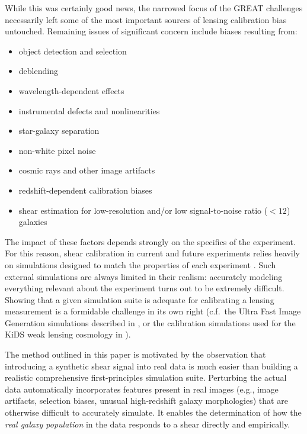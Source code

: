 \documentclass[iop]{emulateapj}
\newcommand\rmcomment[1]{\textcolor{red}{(RM: #1)}}
\begin{document}
While this was certainly good news, the narrowed focus of the GREAT
challenges necessarily left some of the most important sources of
lensing calibration bias untouched. Remaining issues of significant
concern include biases resulting from:
\begin{itemize}
\item object detection and selection
\item deblending
\item wavelength-dependent effects
\item instrumental defects and nonlinearities
\item star-galaxy separation
\item non-white pixel noise
\item cosmic rays and other image artifacts
\item redshift-dependent calibration biases
\item shear estimation for low-resolution and/or low signal-to-noise ratio ($<12$) galaxies
\end{itemize}
The impact of these factors depends strongly on the specifics of the
experiment. For this reason, shear calibration in current and future
experiments relies heavily on simulations designed to match the
properties of each experiment
\citep{KiDS450,2016MNRAS.tmp..827J}. Such external simulations are
always limited in their realism:  accurately modeling everything
relevant about the experiment turns out to be extremely difficult. Showing that a given simulation suite
is adequate for calibrating a lensing measurement is a formidable
challenge in its own right (c.f.\ the Ultra Fast Image Generation
simulations described in \citealt{2013A&C.....1...23B}, or the
calibration simulations used for the KiDS weak lensing cosmology in
\citealt{2016arXiv160605337F}).

The method outlined in this paper is motivated by the observation
that introducing a synthetic shear signal into real data is much
easier than building a realistic comprehensive first-principles simulation
suite. Perturbing the actual data automatically incorporates features
present in real images (e.g., image artifacts, selection biases,
unusual high-redshift galaxy morphologies) that are otherwise
difficult to accurately simulate.  It enables the determination of how the {\em real galaxy
  population} in the data responds to a shear directly and empirically.

\end{document}
